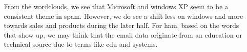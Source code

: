 From the wordclouds, we see that Microsoft and windows XP seem to be a consistent theme in spam. However, we do see a shift less on windows and more towards sales and products during the later half. For ham, based on the words that show up, we may think that the email data originate from an education or technical source due to terms like edu and systems. 